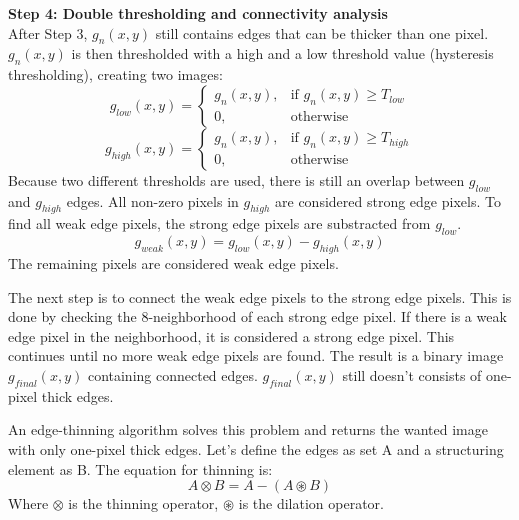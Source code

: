   

\textbf{Step 4: Double thresholding and connectivity analysis} \\
After Step 3, $g_n(x,y)$ still contains edges that can be thicker than one pixel. $g_n(x,y)$ is then thresholded with a high and a low threshold value (hysteresis thresholding), creating two images: 
\begin{equation}
    g_{low}(x,y) = \begin{cases}
    g_n(x,y), & \text{if } g_n(x,y) \geq T_{low} \\
    0, &\text{otherwise}
\end{cases}
\end{equation}
\begin{equation}
    g_{high}(x,y) = \begin{cases}
    g_n(x,y), & \text{if } g_n(x,y) \geq T_{high} \\
    0, &\text{otherwise}
\end{cases}
\end{equation}
Because two different thresholds are used, there is still an overlap between $g_{low}$ and $g_{high}$ edges. All non-zero pixels in $g_{high}$ are considered strong edge pixels. To find all weak edge pixels, the strong edge pixels are substracted from $g_{low}$. 
\begin{equation}
    g_{weak}(x,y) = g_{low}(x,y) - g_{high}(x,y)
\end{equation}
The remaining pixels are considered weak edge pixels.

The next step is to connect the weak edge pixels to the strong edge pixels. This is done by checking the 8-neighborhood of each strong edge pixel. If there is a weak edge pixel in the neighborhood, it is considered a strong edge pixel. This continues until no more weak edge pixels are found. The result is a binary image $g_{final}(x,y)$ containing connected edges. $g_{final}(x,y)$ still doesn't consists of one-pixel thick edges. 

An edge-thinning algorithm solves this problem and returns the wanted image with only one-pixel thick edges. Let's define the edges as set A and a structuring element as B. 
The equation for thinning is: 
\begin{equation}
    A \otimes   B = A - (A \circledast B)
\end{equation}
Where $\otimes$ is the thinning operator, $\circledast$ is the dilation operator.

